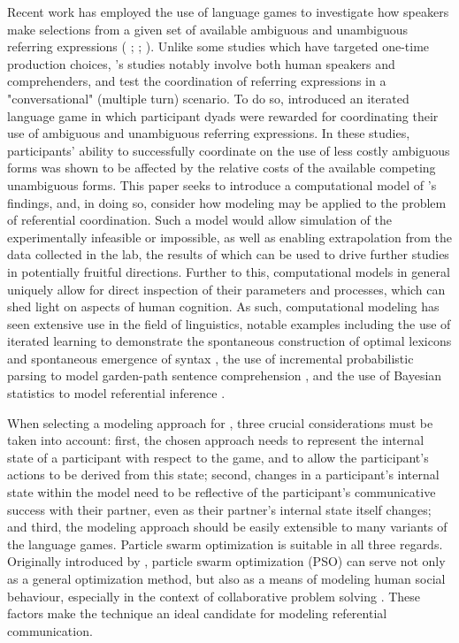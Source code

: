 \documentclass[12pt,a4paper]{article}
\begin{document}
Recent work has employed the use of language games to investigate how speakers make selections from a given set of available ambiguous and unambiguous referring expressions (\citeauthor{rohde2012} \citeyear{rohde2012}; \citeauthor{degen2012} \citeyear{degen2012}; \citeauthor{frank2012} \citeyear{frank2012}). Unlike some studies which have targeted one-time production choices, \citeauthor{rohde2012}'s studies notably involve both human speakers and comprehenders, and test the coordination of referring expressions in a "conversational" (multiple turn) scenario. To do so, \citeauthor{rohde2012} introduced an iterated language game in which participant dyads were rewarded for coordinating their use of ambiguous and unambiguous referring expressions. In these studies, participants' ability to successfully coordinate on the use of less costly ambiguous forms was shown to be affected by the relative costs of the available competing unambiguous forms. This paper seeks to introduce a computational model of \citeauthor{rohde2012}'s findings, and, in doing so, consider how modeling may be applied to the problem of referential coordination. Such a model would allow simulation of the experimentally infeasible or impossible, as well as enabling extrapolation from the data collected in the lab, the results of which can be used to drive further studies in potentially fruitful directions. Further to this, computational models in general uniquely allow for direct inspection of their parameters and processes, which can shed light on aspects of human cognition. As such, computational modeling has seen extensive use in the field of linguistics, notable examples including the use of iterated learning to demonstrate the spontaneous construction of optimal lexicons \citep{smith2002} and spontaneous emergence of syntax \citep{kirby2002}, the use of incremental probabilistic parsing to model garden-path sentence comprehension \citep{hale2001}, and the use of Bayesian statistics to model referential inference \citep{frank2012}.

When selecting a modeling approach for \cite{rohde2012}, three crucial considerations must be taken into account: first, the chosen approach needs to represent the internal state of a participant with respect to the game, and to allow the participant's actions to be derived from this state; second, changes in a participant's internal state within the model need to be reflective of the participant's communicative success with their partner, even as their partner's internal state itself changes; and third, the modeling approach should be easily extensible to many variants of the \citeauthor{rohde2012} language games. Particle swarm optimization is suitable in all three regards. Originally introduced by \citet*{kennedy1995}, particle swarm optimization (PSO) can serve not only as a general optimization method, but also as a means of modeling human social behaviour, especially in the context of collaborative problem solving \citep{kennedy1997}. These factors make the technique an ideal candidate for modeling referential communication. 
\end{document}

